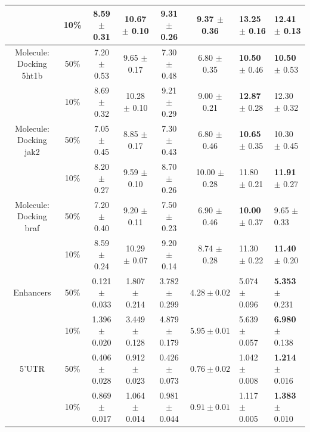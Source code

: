 {\begin{table}[!ht]
{\begin{tabular}{c|c|ccccgg}
& 10\% & 8.59 $\pm$ 0.31 & 10.67 $\pm$ 0.10 & 9.31 $\pm$ 0.26 & 9.37 $\pm$ 0.36 & \textbf{13.25} $\pm$ 0.16 & 12.41 $\pm$ 0.13 \\ \midrule 
 Molecule: Docking 5ht1b  & 50\% & 7.20 $\pm$ 0.53 & 9.65 $\pm$ 0.17 & 7.30 $\pm$ 0.48 & 6.80 $\pm$ 0.35 & \textbf{10.50} $\pm$ 0.46 & \textbf{10.50} $\pm$ 0.53 \\
& 10\% & 8.69 $\pm$ 0.32 & 10.28 $\pm$ 0.10 & 9.21 $\pm$ 0.29 & 9.00 $\pm$ 0.21 & \textbf{12.87} $\pm$ 0.28 & 12.30 $\pm$ 0.32 \\ \midrule
Molecule: Docking jak2 & 50\% & 7.05 $\pm$ 0.45 & 8.85 $\pm$ 0.17 & 7.30 $\pm$ 0.43 & 6.80 $\pm$ 0.46 & \textbf{10.65} $\pm$ 0.35 & 10.30 $\pm$ 0.45 \\
& 10\% & 8.20 $\pm$ 0.27 & 9.59 $\pm$ 0.10 & 8.70 $\pm$ 0.26 & 10.00 $\pm$ 0.28 & 11.80 $\pm$ 0.21 & \textbf{11.91} $\pm$ 0.27 \\ \midrule
Molecule: Docking braf & 50\% & 7.20 $\pm$ 0.40 & 9.20 $\pm$ 0.11 & 7.50 $\pm$ 0.23 & 6.90 $\pm$ 0.46 & \textbf{10.00} $\pm$ 0.37 & 9.65 $\pm$ 0.33 \\
& 10\% & 8.59 $\pm$ 0.24 & 10.29 $\pm$ 0.07 & 9.20 $\pm$ 0.14 & 8.74 $\pm$ 0.28 & 11.30 $\pm$ 0.22 & \textbf{11.40} $\pm$ 0.20 \\ \midrule
  Enhancers & 50\% & 0.121 $\pm$ 0.033 & 1.807 $\pm$ 0.214 & 3.782 $\pm$ 0.299 &  $4.28\pm 0.02$ & 5.074 $\pm$ 0.096 & \textbf{5.353} $\pm$ 0.231 \\
& 10\% & 1.396 $\pm$ 0.020 & 3.449 $\pm$ 0.128 & 4.879 $\pm$ 0.179 & $5.95\pm 0.01$ & 5.639 $\pm$ 0.057 & \textbf{6.980} $\pm$ 0.138 \\ 'UTR & 50\% & 0.406 $\pm$ 0.028 & 0.912 $\pm$ 0.023 & 0.426 $\pm$ 0.073 & $0.76\pm 0.02$ & 1.042 $\pm$ 0.008 & \textbf{1.214} $\pm$ 0.016 \\
& 10\% & 0.869 $\pm$ 0.017 & 1.064 $\pm$ 0.014 & 0.981 $\pm$ 0.044 & $0.91\pm 0.01$ & 1.117 $\pm$ 0.005 & \textbf{1.383} $\pm$ 0.010 \\
\bottomrule
    \end{tabular}
}
\end{table}



}
